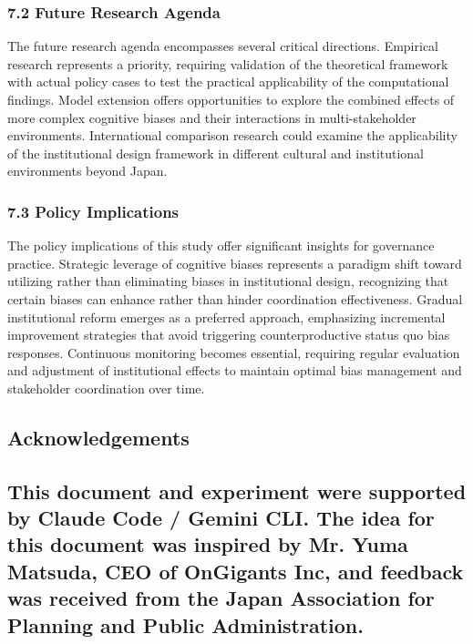 \subsubsection{7.2 Future Research Agenda}\label{future-research-agenda}

The future research agenda encompasses several critical directions. Empirical research represents a priority, requiring validation of the theoretical framework with actual policy cases to test the practical applicability of the computational findings. Model extension offers opportunities to explore the combined effects of more complex cognitive biases and their interactions in multi-stakeholder environments. International comparison research could examine the applicability of the institutional design framework in different cultural and institutional environments beyond Japan.

\subsubsection{7.3 Policy Implications}\label{policy-implications}

The policy implications of this study offer significant insights for governance practice. Strategic leverage of cognitive biases represents a paradigm shift toward utilizing rather than eliminating biases in institutional design, recognizing that certain biases can enhance rather than hinder coordination effectiveness. Gradual institutional reform emerges as a preferred approach, emphasizing incremental improvement strategies that avoid triggering counterproductive status quo bias responses. Continuous monitoring becomes essential, requiring regular evaluation and adjustment of institutional effects to maintain optimal bias management and stakeholder coordination over time.

\subsection{Acknowledgements}\label{acknowledgements}

\subsection{This document and experiment were supported by Claude Code / Gemini CLI. The idea for this document was inspired by Mr. Yuma Matsuda, CEO of OnGigants Inc, and feedback was received from the Japan Association for Planning and Public Administration.}\label{this-document-and-experiment-were-supported-by-claude-code-gemini-cli.-the-idea-for-this-document-was-inspired-by-mr.-yuma-matsuda-ceo-of-ongigants-inc-and-feedback-was-received-from-the-japan-association-for-planning-and-public-administration.}

